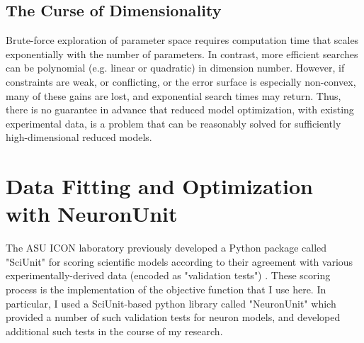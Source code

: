 \subsection{The Curse of Dimensionality}
Brute-force exploration of parameter space requires computation time that scales exponentially with the number of parameters.  In contrast, more efficient searches can be polynomial (e.g. linear or quadratic) in dimension number.  However, if constraints are weak, or conflicting, or the error surface is especially non-convex, many of these gains are lost, and exponential search times may return.  Thus, there is no guarantee in advance that reduced model optimization, with existing experimental data, is a problem that can be reasonably solved for sufficiently high-dimensional reduced models.

\section{Data Fitting and Optimization with NeuronUnit}
The ASU ICON laboratory previously developed a Python package called "SciUnit" for scoring scientific models according to their agreement with various experimentally-derived data (encoded as "validation tests") \cite{omar2014collaborative}.  These scoring process is the implementation of the objective function that I use here.
In particular, I used a SciUnit-based python library called "NeuronUnit" which provided a number of such validation tests for neuron models, and developed additional such tests in the course of my research.

